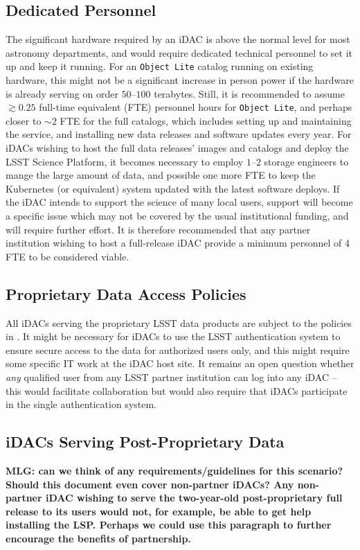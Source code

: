 \subsection{Dedicated Personnel}
The significant hardware required by an iDAC is above the normal level for most astronomy departments, and would require dedicated technical personnel to set it up and keep it running. For an {\tt Object Lite} catalog running on existing hardware, this might not be a significant increase in person power if the hardware is already serving on order $50$--$100$ terabytes. Still, it is recommended to assume $\gtrsim0.25$ full-time equivalent (FTE) personnel hours for {\tt Object Lite}, and perhaps closer to $\sim2$ FTE for the full catalogs, which includes setting up and maintaining the service, and installing new data releases and software updates every year. For iDACs wishing to host the full data releases' images and catalogs and deploy the LSST Science Platform, it becomes necessary to employ $1$--$2$ storage engineers to mange the large amount of data, and possible one more FTE to keep the Kubernetes (or equivalent) system updated with the latest software deploys. If the iDAC intends to support the science of many local users, support will become a specific issue which may not be covered by the usual institutional funding, and will require further effort. It is therefore recommended that any partner institution wishing to host a full-release iDAC provide a minimum personnel of 4 FTE to be considered viable.

\subsection{Proprietary Data Access Policies}
All iDACs serving the proprietary LSST data products are subject to the policies in . It might be necessary for iDACs to use the LSST authentication system to ensure secure access to the data for authorized users only, and this might require some specific IT work at the iDAC host site. It remains an open question whether {\em any} qualified user from any LSST partner institution can log into any iDAC -- this would facilitate collaboration but would also require that iDACs participate in the single authentication system. 

\subsection{iDACs Serving Post-Proprietary Data}
{\bf MLG: can we think of any requirements/guidelines for this scenario? Should this document even cover non-partner iDACs? Any non-partner iDAC wishing to serve the two-year-old post-proprietary full release to its users would not, for example, be able to get help installing the LSP. Perhaps we could use this paragraph to further encourage the benefits of partnership.}


